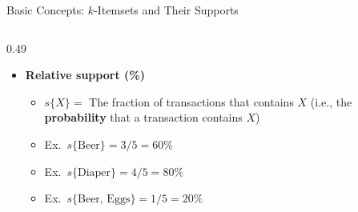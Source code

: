 \documentclass[aspectratio=169, 11pt]{beamer}
\begin{document}
\begin{frame}{Basic Concepts: $k$-Itemsets and Their Supports}
\begin{columns}[T]
\begin{column}{0.49\textwidth}
\begin{itemize}
                \item \textbf{Relative support (\%)}
                \begin{itemize}
                    \item $s\{X\} =$ The fraction of transactions that contains $X$ (i.e., the \textbf{probability} that a transaction contains $X$)
                    \item Ex.\ $s\{\text{Beer}\} = 3/5 = 60\%$
                    \item Ex.\ $s\{\text{Diaper}\} = 4/5 = 80\%$
                    \item Ex.\ $s\{\text{Beer, Eggs}\} = 1/5 = 20\%$
                \end{itemize}
            \end{itemize}
        \end{column}
    \end{columns}
\end{frame}
\end{document}
